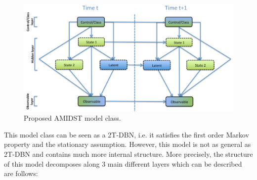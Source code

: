 \begin{figure}[ht!]
\begin{center}
\includegraphics[scale=0.465]{./figures/AMIDSTModelClass}
\caption{\label{Figure:AMIDSTModelClass} Proposed AMIDST model class.}
\end{center}
\end{figure}


This model class can be seen as a 2T-DBN, i.e. it satisfies the first order Markov property and the stationary assumption. However, this model is not as general as 2T-DBN and contains much more internal structure. More precisely, the structure of this model decomposes along 3 main different layers which can be described are follows:

